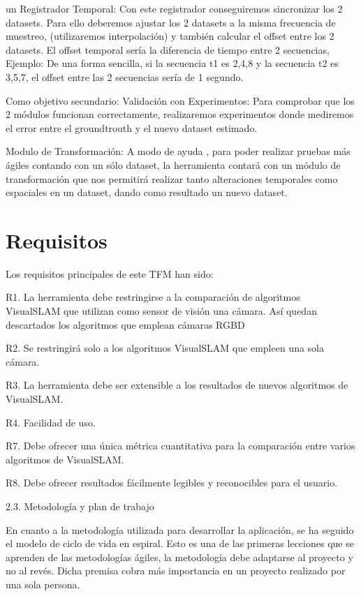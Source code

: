 un Registrador Temporal: Con este registrador conseguiremos sincronizar los 2 datasets. Para ello deberemos ajustar los 2 datasets a la misma frecuencia de muestreo, (utilizaremos interpolación) y también calcular el offset entre los 2 datasets. El offset temporal sería la diferencia de tiempo entre 2 secuencias, 
Ejemplo: De una forma sencilla, si la secuencia t1 es 2,4,8 y la secuencia t2 es 3,5,7, el offset entre las 2 secuencias sería de 1 segundo.

Como objetivo secundario:
Validación con Experimentos:
Para comprobar que los 2 módulos funcionan correctamente, realizaremos experimentos donde mediremos el error entre el groundtrouth y el nuevo dataset estimado.

Modulo de Transformación:
A modo de ayuda , para poder realizar pruebas más ágiles contando con un sólo dataset, la herramienta contará con un módulo de transformación que nos permitirá realizar tanto alteraciones temporales como espaciales en un dataset, dando como resultado un nuevo dataset.

\section {Requisitos}

Los requisitos principales de este TFM han sido:

	R1. La herramienta debe restringirse a la comparación de algoritmos VisualSLAM que utilizan como sensor de visión una cámara. Así quedan descartados los algoritmos que emplean cámaras RGBD

	R2. Se restringirá solo a los algoritmos VisualSLAM que empleen una sola cámara.

	R3. La herramienta debe ser extensible a los resultados de nuevos algoritmos de VisualSLAM.

	R4. Facilidad de uso.

	R7. Debe ofrecer una única métrica cuantitativa para la comparación entre varios algoritmos de VisualSLAM.

	R8. Debe ofrecer resultados fácilmente legibles y reconocibles para el usuario.

2.3. Metodología y plan de trabajo

En cuanto a la metodología utilizada para desarrollar la aplicación, se ha seguido el modelo de ciclo de vida en espiral. Esto es una de las primeras lecciones que se aprenden de las metodologías ágiles, la metodología debe adaptarse al proyecto y no al revés. Dicha premisa cobra más importancia en un proyecto realizado por una sola persona.

